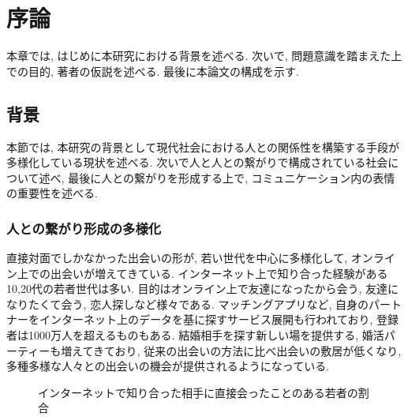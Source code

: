 \chapter{序論}
\label{chap:introduction}

本章では, はじめに本研究における背景を述べる.
次いで, 問題意識を踏まえた上での目的, 著者の仮説を述べる.
最後に本論文の構成を示す.

\section{背景}
本節では, 本研究の背景として現代社会における人との関係性を構築する手段が多様化している現状を述べる.
次いで人と人との繋がりで構成されている社会について述べ,
最後に人との繋がりを形成する上で, コミュニケーション内の表情の重要性を述べる.


\subsection{人との繋がり形成の多様化}
直接対面でしかなかった出会いの形が, 若い世代を中心に多様化して, オンライン上での出会いが増えてきている.
インターネット上で知り合った経験がある10,20代の若者世代は多い\cite{mandom}.
目的はオンライン上で友達になったから会う, 友達になりたくて会う, 恋人探しなど様々である.
マッチングアプリなど, 自身のパートナーをインターネット上のデータを基に探すサービス展開も行われており,
登録者は1000万人を超えるものもある.
結婚相手を探す新しい場を提供する, 婚活パーティーも増えてきており\cite{chane_claire},
従来の出会いの方法に比べ出会いの敷居が低くなり,多種多様な人々との出会いの機会が提供されるようになっている.

\begin{figure}[htbp]
    \begin{center}
    \end{center}
    \caption{インターネットで知り合った相手に直接会ったことのある若者の割合}
    \label{fig:onlinemeeting_to_real}
\end{figure}

